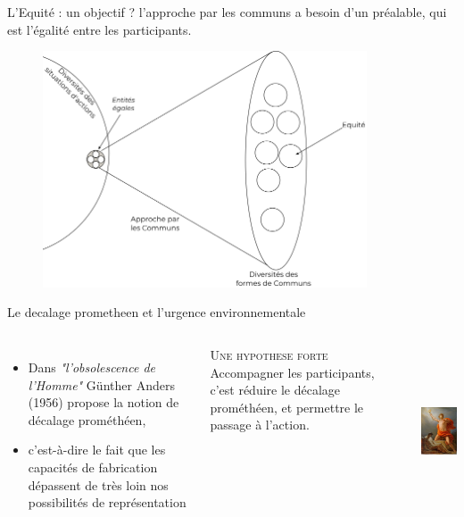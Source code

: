 \documentclass[newPxFont]{beamer}
\begin{document}
  \begin{frame}[c]{L'Equité : un objectif ?}
    \vspace{-1cm}
    l'approche par les communs a besoin d'un préalable, qui est l'égalité entre les participants.
    \begin{figure}
      \includegraphics[height=7cm]{img/commun_egalite_equite.png}
    \end{figure}
  \end{frame}

  \begin{frame}[c]{Le decalage prometheen et l'urgence environnementale}
    \vspace{-1cm}
    \begin{columns}[onlytextwidth,T]
      \column{\dimexpr\linewidth-30mm-5mm}
      \begin{itemize}
        \item Dans \textit{"l'obsolescence de l'Homme"} Günther Anders (1956) propose la notion de décalage prométhéen,
        \item c'est-à-dire le fait que les capacités de fabrication dépassent de très loin nos possibilités de représentation
      \end{itemize}

      \small{
        \begin{alertblock}{\textsc{Une hypothese forte}}
          Accompagner les participants, c'est réduire le décalage prométhéen, et permettre le passage à l'action.
        \end{alertblock}
      }
      \column{30mm}
      \includegraphics[height=5cm]{img/promethee.jpg}
    \end{columns}
  \end{frame}
\end{document}
